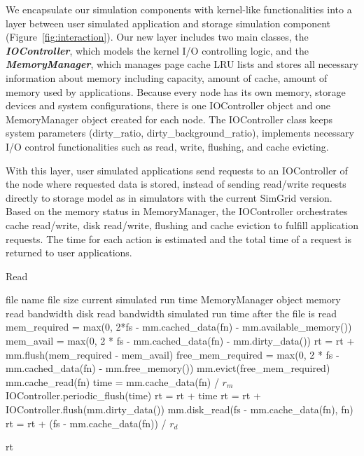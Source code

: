 \documentclass[conference]{IEEEtran}
\newcommand{\Desc}[2]{\State \makebox[2em][l]{#1}#2}
\begin{document}
			We encapsulate our simulation components with kernel-like functionalities 
			into a layer between user simulated application and storage simulation 
			component (Figure~\ref{fig:interaction}). Our new layer includes two main
			classes, the \textbf{\textit{IOController}}, which models the kernel 
			I/O controlling logic, and the \textbf{\textit{MemoryManager}}, which 
			manages page cache LRU lists and stores all necessary information about 
			memory including capacity, amount of cache, amount of memory used 
			by applications. Because every node has its own memory, storage devices 
			and system configurations, there is one IOController object and one 
			MemoryManager object created for each node. The IOController class 
			keeps system parameters (dirty{\_}ratio, dirty{\_}background{\_}ratio), 
			implements necessary I/O control functionalities such as read, write,
			flushing, and cache evicting. 

			With this layer, user simulated applications send requests to an 
			IOController of the node where requested data is stored, instead of 
			sending read/write requests directly to storage model as in simulators 
			with the current SimGrid version. Based on the memory status in 
			MemoryManager, the IOController orchestrates cache read/write, 
			disk read/write, flushing and cache eviction to fulfill application 
			requests. The time for each action is estimated and the total time of 
			a request is returned to user applications.
			
			\begin{algorithm}\caption{Read}\label{alg:read}
				\small
				\begin{algorithmic}[1]
					\Input
        				\Desc{fn}{file name}
        				\Desc{fs}{file size}
						\Desc{rt}{current simulated run time}
						\Desc{mm}{MemoryManager object}
						\Desc{$r_m$}{memory read bandwidth}
						\Desc{$r_d$}{disk read bandwidth}
   					\EndInput
   					\Output
						\Desc{rt}{simulated run time after the file is read}
   					\EndOutput
					\State mem\_required = max(0, 2*fs - mm.cached\_data(fn) - 
					mm.available\_memory()) 
					\State mem\_avail = max(0, 2 * fs - mm.cached\_data(fn) - 
					mm.dirty\_data())
					\State rt = rt +  mm.flush(mem\_required - 
					mem\_avail)	
					\State free\_mem\_required = max(0, 2 * fs - mm.cached\_data(fn) - 
					mm.free\_memory())
					\State mm.evict(free\_mem\_required) 
    					\State mm.cache\_read(fn) 
    						\State time = mm.cache\_data(fn) / $r_m$
    						\State IOController.periodic\_flush(time) 
							\State rt = rt + time
						\EndIf
					\EndIf
						\State rt = rt + IOController.flush(mm.dirty\_data())
						\State mm.disk\_read(fs - mm.cache\_data(fn), fn)
    					\State rt = rt + (fs - mm.cache\_data(fn)) / $r_d$
					\EndIf					
					
					\Return rt
					
				\end{algorithmic}
			\end{algorithm}			
			
\end{document}
